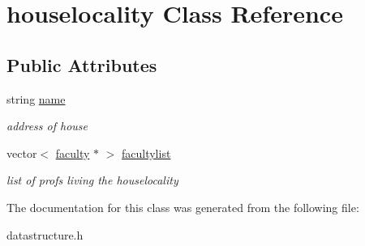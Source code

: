 \hypertarget{classhouselocality}{\section{houselocality \-Class \-Reference}
\label{classhouselocality}
}
\subsection*{\-Public \-Attributes}
\begin{DoxyCompactItemize}
\item 
\hypertarget{classhouselocality_a22ee0b655b52a585eef1ffec2f611820}{string \hyperlink{classhouselocality_a22ee0b655b52a585eef1ffec2f611820}{name}}\label{classhouselocality_a22ee0b655b52a585eef1ffec2f611820}

\begin{DoxyCompactList}\small\item\em address of house \end{DoxyCompactList}\item 
\hypertarget{classhouselocality_a69a0c86c8a57239f7e75ffb866f323bb}{vector$<$ \hyperlink{classfaculty}{faculty} $\ast$ $>$ \hyperlink{classhouselocality_a69a0c86c8a57239f7e75ffb866f323bb}{facultylist}}\label{classhouselocality_a69a0c86c8a57239f7e75ffb866f323bb}

\begin{DoxyCompactList}\small\item\em list of profs living the houselocality \end{DoxyCompactList}\end{DoxyCompactItemize}


\-The documentation for this class was generated from the following file\-:\begin{DoxyCompactItemize}
\item 
datastructure.\-h\end{DoxyCompactItemize}
